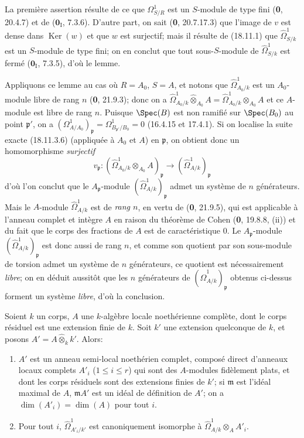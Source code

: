 La première assertion résulte de ce que $\Omega^1_{S/R}$ est un $S$-module de type fini (\textbf{0}, 20.4.7) et de ($\mathbf{0}_{\mathrm I}$, 7.3.6). D'autre part, on sait (\textbf{0}, 20.7.17.3) que l'image de $v$ est dense dans $\operatorname{Ker}(w)$ et que $w$ est surjectif; mais il résulte de (18.11.1) que $\hat{\Omega}^1_{S/k}$ est un $S$-module de type fini; on en conclut que tout sous-$S$-module de $\hat{\Omega}^1_{S/k}$ est fermé ($\mathbf{0}_{\mathrm I}$, 7.3.5), d'où le lemme.

Appliquons ce lemme au cas où $R=A_0$, $S=A$, et notons que $\hat{\Omega}^1_{A_0/k}$ est un $A_0$-module libre de rang $n$ (\textbf{0}, 21.9.3); donc on a $\hat{\Omega}^1_{A_0/k}\widehat{\otimes}_{A_0}A=\hat{\Omega}^1_{A_0/k}\otimes_{A_0}A$ et ce $A$-module est libre de rang $n$. Puisque $\Spec(B)$ est non ramifié sur $\Spec(B_0)$ au point $\mathfrak p'$, on a $(\Omega^1_{A/A_0})_{\mathfrak p}=\Omega^1_{B_{\mathfrak p'}/B_0}=0$ (16.4.15 et 17.4.1). Si on localise la suite exacte (18.11.3.6) (appliquée à $A_0$ et $A$) en $\mathfrak p$, on obtient donc un homomorphisme \emph{surjectif}
\[
  v_{\mathfrak p}:(\hat{\Omega}^1_{A_0/k}\otimes_{A_0}A)_{\mathfrak p}\longrightarrow(\hat{\Omega}^1_{A/k})_{\mathfrak p}
\]
d'où l'on conclut que le $A_{\mathfrak p}$-module $(\hat{\Omega}^1_{A/k})_{\mathfrak p}$ admet un système de $n$ générateurs. Mais le $A$-module $\hat{\Omega}^1_{A/k}$ est de \emph{rang $n$}, en vertu de (\textbf{0}, 21.9.5), qui est applicable à l'anneau complet et intègre $A$ en raison du théorème de Cohen (\textbf{0}, 19.8.8, (ii)) et du fait que le corps des fractions de $A$ est de caractéristique 0. Le $A_{\mathfrak p}$-module $(\hat{\Omega}^1_{A/k})_{\mathfrak p}$ est donc aussi de rang $n$, et comme son quotient par son sous-module de torsion admet un système de $n$ générateurs, ce quotient est nécessairement \emph{libre}; on en déduit aussitôt que les $n$ générateurs de $(\hat{\Omega}^1_{A/k})_{\mathfrak p}$ obtenus ci-dessus forment un système \emph{libre}, d'où la conclusion.

\begin{lemma}[18.11.4]
\label{IV.18.11.4}
Soient $k$ un corps, $A$ une $k$-algèbre locale noethérienne complète, dont le corps résiduel est une extension finie de $k$. Soit $k'$ une extension quelconque de $k$, et posons $A'=A\widehat{\otimes}_k k'$. Alors:
\begin{enumerate}
  \item[\textup{(i)}] $A'$ est un anneau semi-local noethérien complet, composé direct d'anneaux locaux complets $A'_i$ \textup{($1\leq i\leq r$)} qui sont des $A$-modules fidèlement plats, et dont les corps résiduels sont des extensions finies de $k'$; si $\mathfrak m$ est l'idéal maximal de $A$, $\mathfrak mA'$ est un idéal de définition de $A'$; on a $\dim(A'_i)=\dim(A)$ pour tout $i$.
  \item[\textup{(ii)}] Pour tout $i$, $\hat{\Omega}^1_{A'_i/k'}$ est canoniquement isomorphe à $\hat{\Omega}^1_{A/k}\otimes_A A'_i$.
\end{enumerate}
\end{lemma}

